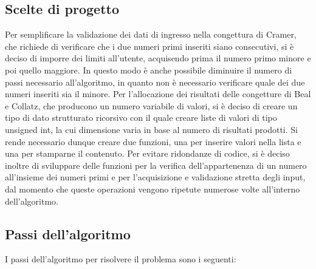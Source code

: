 \documentclass[10pt]{report}
\begin{document}
\subsection{Scelte di progetto}
Per semplificare la validazione dei dati di ingresso nella congettura di Cramer, che richiede di verificare che i due numeri primi inseriti siano consecutivi, 
si è deciso di imporre dei limiti all'utente, acquisendo prima il numero primo minore e poi quello maggiore. In questo modo è anche possibile diminuire il numero di passi
necessario all'algoritmo, in quanto non è necessario verificare quale dei due numeri inseriti sia il minore.
\newline
\newline
Per l'allocazione dei risultati delle congetture di Beal e Collatz, che producono un numero variabile di valori, si è deciso di creare un tipo di dato strutturato 
ricorsivo con il quale creare liste di valori di tipo unsigned int, la cui dimensione varia in base al numero di risultati prodotti. Si rende necessario dunque creare due 
funzioni, una per inserire valori nella lista e una per stamparne il contenuto.
\newline
\newline
Per evitare ridondanze di codice, si è deciso inoltre di sviluppare delle funzioni per la verifica dell'appartenenza di un numero all'insieme dei numeri primi e per l'acquisizione e validazione stretta degli input, dal momento che queste operazioni vengono ripetute numerose volte all'interno dell'algoritmo.


\subsection{Passi dell'algoritmo}
I passi dell'algoritmo per risolvere il problema sono i seguenti:
\end{document}
